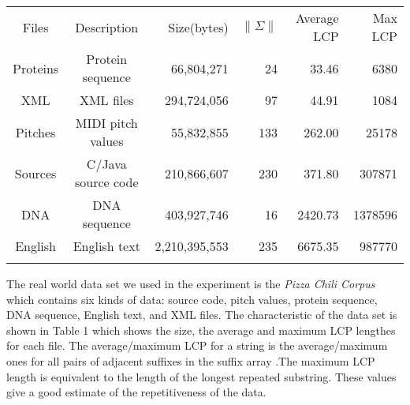 \documentclass{ws-ijprai}
\begin{document}
\begin{table}[th]
{ \begin{tabular}{@{}ccrrrr@{}} \toprule
  Files & Description & Size(bytes) & $\|\Sigma\|$ & Average LCP & Max LCP \\ \colrule
 Proteins & Protein sequence & 66,804,271 & 24 & 33.46 & 6380\\
 XML & XML files & 294,724,056 & 97 & 44.91 & 1084 \\
 Pitches & MIDI pitch values & 55,832,855 & 133 & 262.00 & 25178\\
 Sources & C/Java source code & 210,866,607 & 230 & 371.80 & 307871\\
 DNA & DNA sequence & 403,927,746 & 16 & 2420.73 & 1378596\\
 English & English text & 2,210,395,553 & 235  &6675.35 & 987770\\ \botrule
  \end{tabular}}
  \label{tab:data}
\end{table}

The real world data set we used in the experiment is the \emph{Pizza
 Chili Corpus}\cite{dataset} which contains six kinds of data:
source code, pitch values, protein sequence, DNA sequence, English
text, and XML files. The characteristic of the data set is shown in
Table 1 which shows the size, the average and maximum LCP
lengthes for each file. The average/maximum LCP for a string is the
average/maximum ones for all pairs of adjacent suffixes in the suffix
array .The maximum LCP length is equivalent to the length of the
longest repeated substring. These values give a good estimate of the
repetitiveness of the data.
\end{document}
